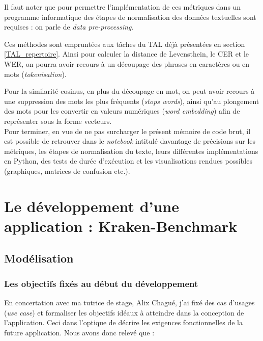 Il faut noter que pour permettre l'implémentation de ces métriques dans un programme informatique des étapes de normalisation des données textuelles sont requises : on parle de \textit{data pre-processing}. 

Ces méthodes sont empruntées aux tâches du TAL déjà présentées en section \ref{TAL_repertoire}. Ainsi pour calculer la distance de Levensthein, le CER et le WER, on pourra avoir recours à un découpage des phrases en caractères ou en mots (\textit{tokenisation}). 

Pour la similarité cosinus, en plus du découpage en mot, on peut avoir recours à une suppression des mots les plus fréquents (\textit{stops words}), ainsi qu'au plongement des mots pour les convertir en valeurs numériques (\textit{word embedding}) afin de représenter sous la forme vecteurs.\\

Pour terminer, en vue de ne pas surcharger le présent mémoire de code brut, il est possible de retrouver dans le \textit{notebook} intitulé  davantage de précisions sur les métriques, les étapes de normalisation du texte, leurs différentes implémentations en Python, des tests de durée d'exécution et les visualisations rendues possibles (graphiques, matrices de confusion etc.).\\

\chapter{Le développement d'une application : Kraken-Benchmark}

\section{Modélisation }

\subsection{Les objectifs fixés au début du développement}
En concertation avec ma tutrice de stage, Alix Chagué, j'ai fixé des cas d'usages (\textit{use case}) et formaliser les objectifs idéaux à atteindre dans la conception de l'application. Ceci dans l'optique de  décrire les exigences fonctionnelles de la future application. Nous avons donc relevé que :


